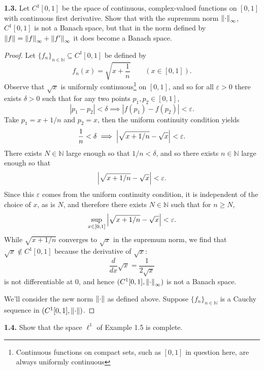 \documentclass[12pt]{article}
\theoremstyle{definition}
\begin{document}
	\noindent \textbf{1.3.} Let $C^1[0, 1]$ be the space of continuous, complex-valued functions on $[0, 1]$ with continuous first derivative. Show that with the supremum norm $\norm{\cdot}_\infty$, $C^1[0, 1]$ is not a Banach space, but that in the norm defined by $\norm{f} = \norm{f}_\infty + \norm{f'}_\infty$ it does become a Banach space. 
		\begin{proof}
			Let $\{f_n\}_{n \in \mathbb{N}} \subseteq C^1[0, 1]$ be defined by $$f_n(x) = \sqrt{x + \frac{1}{n}} \qquad (x \in [0, 1]).$$ Observe that $\sqrt{x}$ is uniformly continuous\footnote{Continuous functions on compact sets, such as $[0, 1]$ in question here, are always uniformly continuous} on $[0, 1]$, and so for all $\varepsilon > 0$ there exists $\delta > 0$ such that for any two points $p_1, p_2 \in [0, 1]$, $$|p_1 - p_2| < \delta \implies |f(p_1) - f(p_2)| < \varepsilon.$$  Take $p_1 = x + 1/n$ and $p_2 = x$, then the uniform continuity condition yields $$\frac{1}{n} < \delta \implies \abs{\sqrt{x + 1/n} - \sqrt{x}} < \varepsilon.$$ There exists $N \in \mathbb{N}$ large enough so that $1/n < \delta$, and so there exists $n \in \mathbb{N}$ large enough so that $$\abs{\sqrt{x + 1/n} - \sqrt{x}} < \varepsilon.$$ Since this $\varepsilon$ comes from the uniform continuity condition, it is independent of the choice of $x$, as is $N$, and therefore there exists $N \in \mathbb{N}$ such that for $n \geq N$, $$\sup_{x \in [0, 1]} \abs{\sqrt{x + 1/n} - \sqrt{x}} < \varepsilon.$$ While $\sqrt{x + 1/n}$ converges to $\sqrt{x}$ in the supremum norm, we find that $\sqrt{x} \notin C^1[0, 1]$ because the derivative of $\sqrt{x}$: $$\frac{d}{dx} \sqrt{x} = \frac{1}{2 \sqrt{x}}$$ is not differentiable at 0, and hence $(C^1[0, 1], \norm{\cdot}_\infty)$ is not a Banach space. 
			
			
			
			We'll consider the new norm $\norm{\cdot}$ as defined above. Suppose $\{f_n\}_{n \in \mathbb{N}}$ is a Cauchy sequence in $(C^1[0, 1], \norm{\cdot})$. 
		\end{proof}
	
	\noindent \textbf{1.4.} Show that the space $\ell^1$ of Example 1.5 is complete. 
\end{document}

